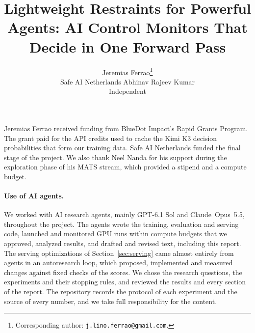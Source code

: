 \documentclass{article}
\title{Lightweight Restraints for Powerful Agents: AI Control Monitors That Decide in One Forward Pass}
\author{%
    Jeremias Ferrao\thanks{Corresponding author: \texttt{j.lino.ferrao@gmail.com}.} \\
    Safe AI Netherlands
    \And
    Abhinav Rajeev Kumar \\
    Independent
}
\begin{document}
\maketitle










\label{main-text-end} %

\begin{ack}
Jeremias Ferrao received funding from BlueDot Impact's Rapid Grants Program.
The grant paid for the API credits used to cache the Kimi K3 decision
probabilities that form our training data. Safe AI Netherlands funded the
final stage of the project. We also thank Neel Nanda for his
support during the exploration phase of his MATS stream, which provided a
stipend and a compute budget.

\paragraph{Use of AI agents.}
We worked with AI research agents, mainly GPT-6.1 Sol and Claude~Opus~5.5,
throughout the project. The agents wrote the training, evaluation and serving
code, launched and monitored GPU runs within compute budgets that we approved,
analyzed results, and drafted and revised text, including this report. The
serving optimizations of Section~\ref{sec:serving} came almost entirely from
agents in an autoresearch loop, which proposed, implemented and measured
changes against fixed checks of the scores. We
chose the research questions, the experiments and their stopping rules, and
reviewed the results and every section of the report. The repository records
the protocol of each experiment and the source of every number, and we take
full responsibility for the content.
\end{ack}




\appendix

\end{document}
